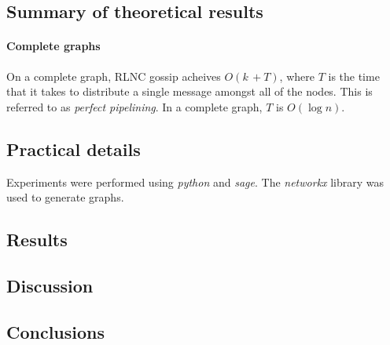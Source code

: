 \documentclass{article} %
\def\numMessages{\textit{k}\,}
\begin{document}
\subsection{Summary of theoretical results}
\paragraph{Complete graphs}
On a complete graph, RLNC gossip acheives $O(\numMessages + T)$, where $T$ is the time that it takes to distribute a single message amongst all of the nodes. This is referred to as \textit{perfect pipelining}. In a complete graph, $T$ is $O(\log{n})$.

\subsection{Practical details}
Experiments were performed using \textit{python} and \textit{sage}. The \textit{networkx} library was used to generate graphs.

\subsection{Results}
\begin{figure}
\centering
{}
\label{fig:runtimes}
\end{figure} 

\subsection{Discussion}

\subsection{Conclusions}

\nocite{*}




\end{document}
